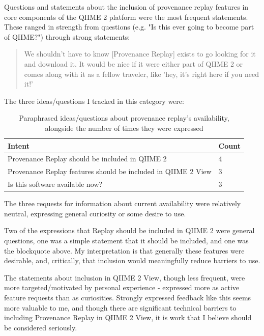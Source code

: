 Questions and statements about the inclusion of provenance replay features in
core components of the QIIME 2 platform were the most frequent statements. These
ranged in strength from questions (e.g. "Is this ever going to become part of
QIIME?") through strong statements:

\begin{quote}
We shouldn't have to know [Provenance Replay] exists to go looking for it and
download it. It would be nice if it were either part of QIIME 2 or comes along
with it as a fellow traveler, like 'hey, it's right here if you need it!'
\end{quote}

\noindent The three ideas/questions I tracked in this category were:

\begin{table}[htp]
    \centering
    \begin{tabular}{|p{}|p{}|}
    \hline
    Intent                                                          & Count \\ \hline
    Provenance Replay should be included in QIIME 2                 & 4     \\
    Provenance Replay features should be included in QIIME 2 View   & 3     \\
    Is this software available now?                                 & 3      \\ \hline
    \end{tabular}
    \caption[Focus Group discussions of Provenance Replay's inclusion in QIIME 2]%
    {Paraphrased ideas/questions about provenance replay’s availability,
    alongside the number of times they were expressed}
    \label{tab:platform_inclusion}
\end{table}

The three requests for information about current availability were relatively
neutral, expressing general curiosity or some desire to use.

Two of the expressions that Replay should be included in QIIME 2 were general
questions, one was a simple statement that it should be included, and one was
the blockquote above. My interpretation is that generally these features were
desirable, and, critically, that inclusion would meaningfully reduce barriers to
use.

The statements about inclusion in QIIME 2 View, though less frequent, were more
targeted/motivated by personal experience - expressed more as active feature
requests than as curiosities. Strongly expressed feedback like this seems more
valuable to me, and though there are significant technical barriers to including
Provenance Replay in QIIME 2 View, it is work that I believe should be considered
seriously. 

